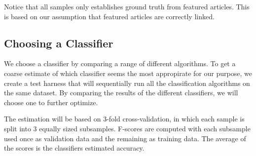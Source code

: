 Notice that all samples only establishes ground truth from featured articles. This is based on our assumption that featured articles are correctly linked.

\subsection{Choosing a Classifier}\label{choosing_classifier}
We choose a classifier by comparing a range of different algorithms. To get a coarse estimate of which classifier seems the most appropirate for our purpose, we create a test harness that will sequentially run all the classification algorithms on the same dataset. By comparing the results of the different classifiers, we will choose one to further optimize.

The estimation will be based on 3-fold cross-validation, in which each sample is split into 3 equally sized subsamples. F-scores are computed with each subsample used once as validation data and the remaining as training data. The average of the scores is the classifiers estimated accuracy.





